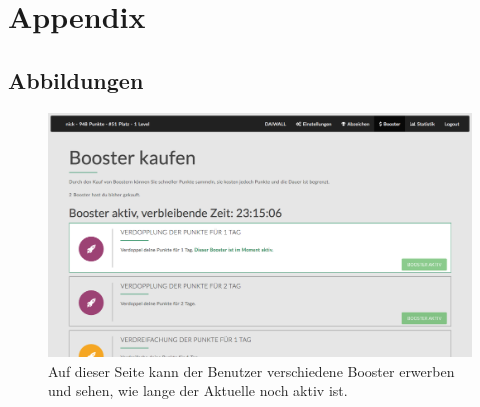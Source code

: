 \documentclass[12pt,twoside]{book}
\begin{document}
\chapter*{Appendix}

\section*{Abbildungen}


\begin{figure}[htbp]
    \centering
    \includegraphics[width=1.0\textwidth]{images/infoboard_booster.png}
    \caption{Auf dieser Seite kann der Benutzer verschiedene Booster erwerben und sehen, wie lange der Aktuelle noch aktiv ist.}
    \label{fig:booster}
\end{figure}
\end{document}

